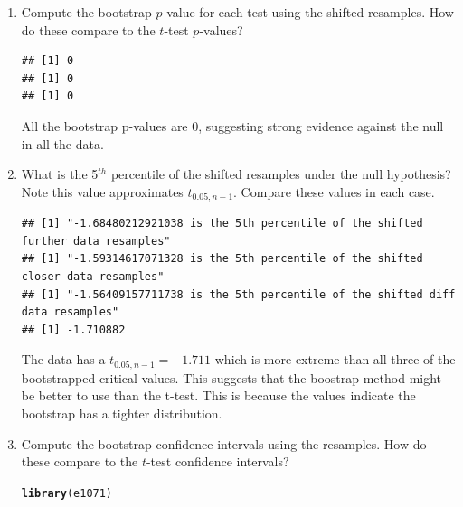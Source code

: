 \documentclass{article}\usepackage[]{graphicx}\usepackage[]{xcolor}
\makeatletter
\newcommand{\hldef}[1]{\textcolor[rgb]{0.345,0.345,0.345}{#1}}%
\newcommand{\hlkwd}[1]{\textcolor[rgb]{0.737,0.353,0.396}{\textbf{#1}}}%
\newenvironment{kframe}{%
 \def\at@end@of@kframe{}%
 \ifinner\ifhmode%
  \def\at@end@of@kframe{\end{minipage}}%
  \begin{minipage}{\columnwidth}%
 \fi\fi%
 \def\FrameCommand##1{\hskip\@totalleftmargin \hskip-\fboxsep
 \colorbox{shadecolor}{##1}\hskip-\fboxsep
     \hskip-\linewidth \hskip-\@totalleftmargin \hskip\columnwidth}%
 \MakeFramed {\advance\hsize-\width
   \@totalleftmargin\z@ \linewidth\hsize
   \@setminipage}}%
 {\par\unskip\endMakeFramed%
 \at@end@of@kframe}
\newenvironment{knitrout}{}{} %
\makeatother
\begin{document}
\begin{enumerate}
\begin{enumerate}
  \item Compute the bootstrap $p$-value for each test using the shifted resamples. 
  How do these compare to the $t$-test $p$-values?
  
\begin{knitrout}
\color{fgcolor}\begin{kframe}
\begin{verbatim}
## [1] 0
## [1] 0
## [1] 0
\end{verbatim}
\end{kframe}
\end{knitrout}
   
All the bootstrap p-values are 0, suggesting strong evidence against the null in all the data.

   
    \item What is the 5$^{th}$ percentile of the shifted resamples under the null hypothesis? 
  Note this value approximates $t_{0.05, n-1}$. Compare these values in each case.
  
\begin{knitrout}
\color{fgcolor}\begin{kframe}
\begin{verbatim}
## [1] "-1.68480212921038 is the 5th percentile of the shifted further data resamples"
## [1] "-1.59314617071328 is the 5th percentile of the shifted closer data resamples"
## [1] "-1.56409157711738 is the 5th percentile of the shifted diff data resamples"
## [1] -1.710882
\end{verbatim}
\end{kframe}
\end{knitrout}
  
The data has a $t_{0.05, n-1} = -1.711$ which is more extreme than all three of the bootstrapped critical values. This suggests that the boostrap method might be better to use than the t-test. This is because the values indicate the bootstrap has a tighter distribution.
  
  
  \item Compute the bootstrap confidence intervals using the resamples. How do these 
  compare to the $t$-test confidence intervals?
  
\begin{knitrout}
\color{fgcolor}\begin{kframe}
\begin{alltt}
\hlkwd{library}\hldef{(e1071)}


\end{alltt}
\end{kframe}
\end{knitrout}
\end{enumerate}
\end{enumerate}
\end{document}
